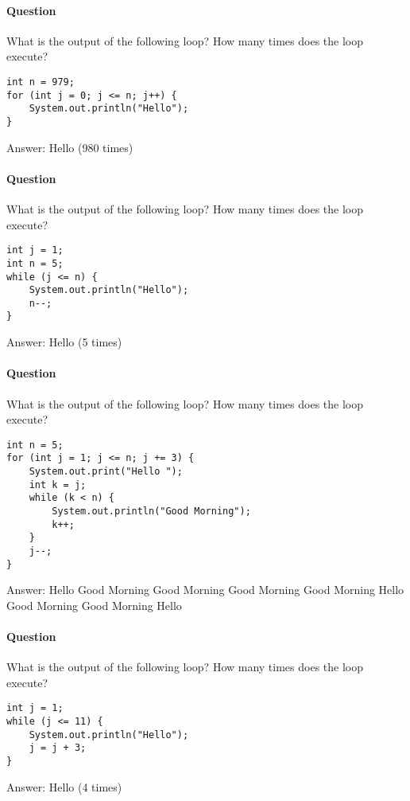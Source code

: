 \documentclass{article}
\begin{document}
\paragraph{Question }
What is the output of the following loop? How many times does the loop execute?
\begin{lstlisting}
int n = 979;
for (int j = 0; j <= n; j++) {
	System.out.println("Hello");
}
\end{lstlisting}
{\color{red}Answer: Hello (980 times)}

\addtocounter{question_num}{1}
\paragraph{Question }
What is the output of the following loop? How many times does the loop execute?
\begin{lstlisting}
int j = 1;
int n = 5;
while (j <= n) {
	System.out.println("Hello");
	n--;
}
\end{lstlisting}
{\color{red}Answer: Hello (5 times)}

\addtocounter{question_num}{1}
\paragraph{Question }
What is the output of the following loop? How many times does the loop execute?
\begin{lstlisting}
int n = 5;
for (int j = 1; j <= n; j += 3) {
	System.out.print("Hello ");
	int k = j;
	while (k < n) {
		System.out.println("Good Morning");
		k++;
	}
	j--;
}
\end{lstlisting}
{\color{red}Answer:
\newline Hello Good Morning
\newline Good Morning
\newline Good Morning
\newline Good Morning
\newline Hello Good Morning
\newline Good Morning
\newline Hello
}

\addtocounter{question_num}{1}
\paragraph{Question }
What is the output of the following loop? How many times does the loop execute?
\begin{lstlisting}
int j = 1;
while (j <= 11) {
	System.out.println("Hello");
	j = j + 3;
}
\end{lstlisting}
{\color{red}Answer: Hello (4 times)}
\end{document}
